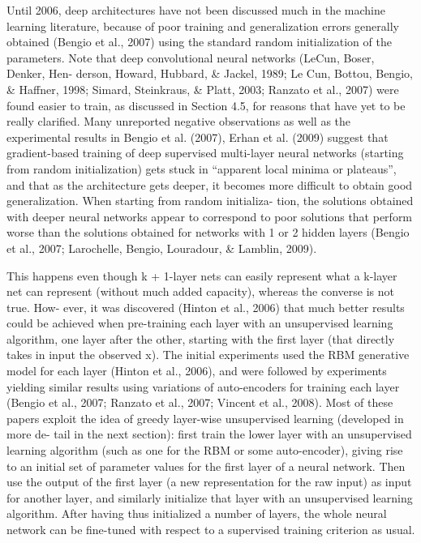 \documentclass[cic,tc]{iiufrgs}
\begin{document}
Until 2006, deep architectures have not been discussed much in the machine
learning literature, because of poor training and generalization errors
generally obtained (Bengio et al., 2007) using the standard random
initialization of the parameters. Note that deep convolutional neural
networks (LeCun, Boser, Denker, Hen- derson, Howard, Hubbard, \& Jackel, 1989;
Le Cun, Bottou, Bengio, \& Haffner, 1998; Simard, Steinkraus, \& Platt, 2003;
Ranzato et al., 2007) were found easier to train, as discussed in Section
4.5, for reasons that have yet to be really clarified.  Many unreported
negative observations as well as the experimental results in Bengio et al.
(2007), Erhan et al. (2009) suggest that gradient-based training of deep
supervised multi-layer neural networks (starting from random initialization)
gets stuck in “apparent local minima or plateaus”, and that as the
architecture gets deeper, it becomes more difficult to obtain good
generalization. When starting from random initializa- tion, the solutions
obtained with deeper neural networks appear to correspond to poor solutions
that perform worse than the solutions obtained for networks with 1 or 2
hidden layers (Bengio et al., 2007; Larochelle, Bengio, Louradour, \& Lamblin,
2009).\cite{bengio2009learning}

This happens even though k + 1-layer nets can easily represent what a k-layer
net can represent (without much added capacity), whereas the converse is not
true. How- ever, it was discovered (Hinton et al., 2006) that much better
results could be achieved when pre-training each layer with an unsupervised
learning algorithm, one layer after the other, starting with the first layer
(that directly takes in input the observed x). The initial experiments used
the RBM generative model for each layer (Hinton et al., 2006), and were
followed by experiments yielding similar results using variations of
auto-encoders for training each layer (Bengio et al., 2007; Ranzato et al.,
2007; Vincent et al., 2008).  Most of these papers exploit the idea of greedy
layer-wise unsupervised learning (developed in more de- tail in the next
section): first train the lower layer with an unsupervised learning algorithm
(such as one for the RBM or some auto-encoder), giving rise to an initial set
of parameter values for the first layer of a neural network. Then use the
output of the first layer (a new representation for the raw input) as input
for another layer, and similarly initialize that layer with an unsupervised
learning algorithm. After having thus initialized a number of layers, the
whole neural network can be fine-tuned with respect to a supervised training
criterion as usual.\cite{bengio2009learning}
\end{document}
